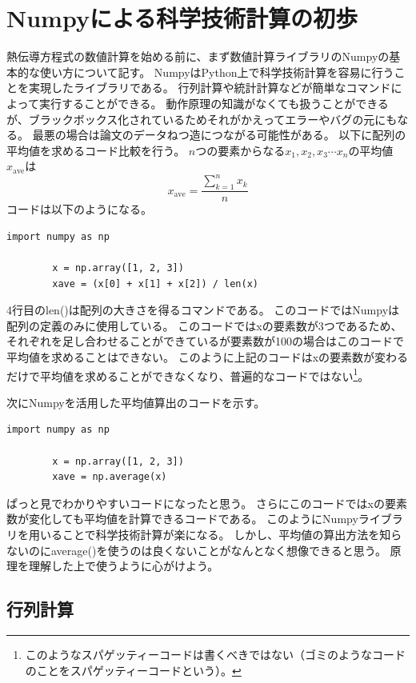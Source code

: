 \documentclass[]{ltjsarticle}
\begin{document}
	\section{Numpyによる科学技術計算の初歩}
	熱伝導方程式の数値計算を始める前に、まず数値計算ライブラリのNumpyの基本的な使い方について記す。
	NumpyはPython上で科学技術計算を容易に行うことを実現したライブラリである。
	行列計算や統計計算などが簡単なコマンドによって実行することができる。
	動作原理の知識がなくても扱うことができるが、ブラックボックス化されているためそれがかえってエラーやバグの元にもなる。
	最悪の場合は論文のデータねつ造につながる可能性がある。
	以下に配列の平均値を求めるコード比較を行う。
	$n$つの要素からなる$x_1, x_2, x_3 \cdots x_n$の平均値$x_\mathrm{ave}$は
	\begin{equation}
	x_\mathrm{ave} = \frac{\displaystyle{\sum_{k=1}^{n}x_k}}{n}
	\end{equation}
	コードは以下のようになる。
	\begin{lstlisting}[caption=average.py, label=average]
		import numpy as np

		x = np.array([1, 2, 3])
		xave = (x[0] + x[1] + x[2]) / len(x) 
	\end{lstlisting}
	4行目のlen()は配列の大きさを得るコマンドである。
	このコードではNumpyは配列の定義のみに使用している。
	このコードではxの要素数が3つであるため、それぞれを足し合わせることができているが要素数が100の場合はこのコードで平均値を求めることはできない。
	このように上記のコードはxの要素数が変わるだけで平均値を求めることができなくなり、普遍的なコードではない\footnote{このようなスパゲッティーコードは書くべきではない（ゴミのようなコードのことをスパゲッティーコードという）。}。

	次にNumpyを活用した平均値算出のコードを示す。
	\begin{lstlisting}[caption=averagenumpy.py, label=avenumpy]
		import numpy as np

		x = np.array([1, 2, 3])
		xave = np.average(x)
	\end{lstlisting}
	ぱっと見でわかりやすいコードになったと思う。
	さらにこのコードではxの要素数が変化しても平均値を計算できるコードである。
	このようにNumpyライブラリを用いることで科学技術計算が楽になる。
	しかし、平均値の算出方法を知らないのにaverage()を使うのは良くないことがなんとなく想像できると思う。
	原理を理解した上で使うように心がけよう。

	\subsection{行列計算}


	


	
\end{document}

